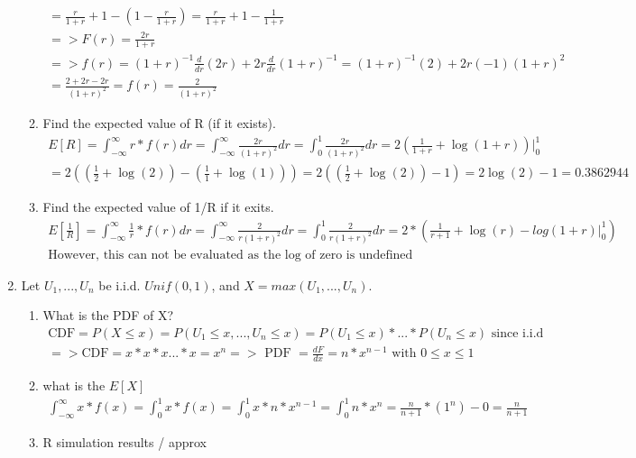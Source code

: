 \documentclass[11pt]{article}
\begin{document}
\begin{enumerate}
\begin{enumerate}
\begin{gather}
	= \frac{r}{1+r} + 1 - (1-\frac{r}{1+r}) = \frac{r}{1+r} + 1 - \frac{1}{1+r} \\
	=> F(r) = \frac{2r}{1+r} \\
	=> f(r) = (1+r)^{-1} \frac{d}{dr}(2r)+ 2r\frac{d}{dr}(1+r)^{-1}=(1+r)^{-1}(2)+ 2r(-1)(1+r)^{2} \\
	= \frac{2+2r - 2r}{(1+r)^{2}} = f(r) = \frac{2}{(1+r)^{2}}
	\end{gather}
	\item Find the expected value of R (if it exists).
	\begin{gather}
	E[R] = \int_{-\infty}^{\infty}r*f(r)dr = \int_{-\infty}^{\infty}\frac{2r}{(1+r)^{2}}dr = \int_{0}^{1}\frac{2r}{(1+r)^{2}}dr = 2(\frac{1}{1+r} + \log(1+r))\Big|_0^1\\ 
	= 2((\frac{1}{2} + \log(2)) - (\frac{1}{1} + \log(1))) = 2((\frac{1}{2} + \log(2)) - 1) = 2\log(2) - 1 = 0.3862944
	\end{gather}
	\item Find the expected value of 1/R if it exits.
	\begin{gather}
	E[\frac{1}{R}] = \int_{-\infty}^{\infty}\frac{1}{r}*f(r)dr = \int_{-\infty}^{\infty}\frac{2}{r(1+r)^{2}}dr = \int_{0}^{1}\frac{2}{r(1+r)^{2}}dr = 2*(\frac{1}{r+1} + \log(r) - log(1+r)\Big|_0^1)\\ 
	\text{However, this can not be evaluated as the log of zero is undefined}
	\end{gather}
\end{enumerate}
\item Let $U_1,...,U_n$ be i.i.d. $Unif(0,1)$, and $X = max(U_1,...,U_n)$.
\begin{enumerate}
	\item What is the PDF of X?
	\begin{gather}
		\text{CDF} = P(X \le x) = P(U_1 \le x , ... , U_n \le x) = P(U_1 \le x) *  ... * P(U_n \le x) \text{ since i.i.d}\\
		=> \text{CDF} = x*x*x...*x = x^n => \text{ PDF } = \frac{dF}{dx} = n*x^{n-1} \text{ with } 0 \le x \le 1
	\end{gather}
	\item what is the $E[X]$
	\begin{gather}
		\int_{-\infty}^{\infty}x*f(x) = \int_{0}^{1}x*f(x) = \int_{0}^{1}x*n*x^{n-1} = \int_{0}^{1}n*x^{n} =\frac{n}{n+1}*(1^n) - 0 = \frac{n}{n+1}
	\end{gather}
	\item R simulation results / approx
	\begin{verbatim}

\end{verbatim}
\end{enumerate}
\end{enumerate}
\end{document}

